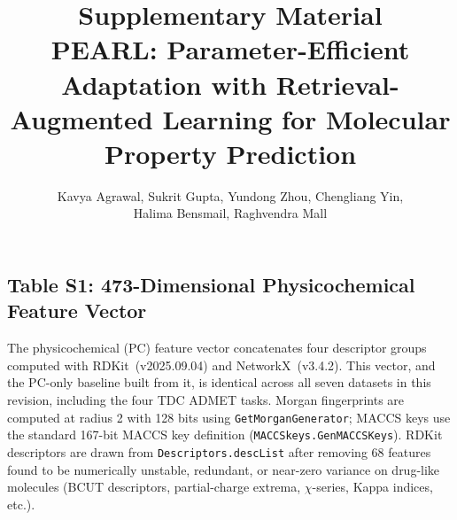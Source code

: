 \documentclass[9pt,a4paper]{article}
\title{\textbf{Supplementary Material}\\[4pt]
{\large PEARL: Parameter-Efficient Adaptation with
Retrieval-Augmented Learning for Molecular Property Prediction}}
\author{Kavya Agrawal, Sukrit Gupta, Yundong Zhou, Chengliang Yin,\\
Halima Bensmail, Raghvendra Mall}
\date{}
\begin{document}
\maketitle
\tableofcontents
\newpage



\subsection*{Table S1: 473-Dimensional Physicochemical Feature Vector}

The physicochemical (PC) feature vector concatenates four descriptor groups computed
with RDKit~(v2025.09.04) and NetworkX~(v3.4.2). This vector, and the PC-only baseline built from it,
is identical across all seven datasets in this revision, including the four TDC
ADMET tasks.
Morgan fingerprints are computed at radius 2 with 128 bits using
\texttt{GetMorganGenerator}; MACCS keys use the standard 167-bit MACCS key
definition (\texttt{MACCSkeys.GenMACCSKeys}).
RDKit descriptors are drawn from \texttt{Descriptors.descList} after removing
68 features found to be numerically unstable, redundant, or near-zero variance
on drug-like molecules (BCUT descriptors, partial-charge extrema, $\chi$-series,
Kappa indices, etc.).
\end{document}
